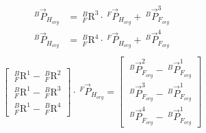 \documentclass[12pt]{article}
\begin{document}
\begin{CJK}{UTF8}{bsmi}
\begin{equation*}
\begin{split}
^{B}\vec{P}_{H_{org}} &=\  _{F}^{B}\textrm{R}^{3}\cdot\ ^{F}\vec{P}_{H_{org}} +\ ^{B}\vec{P}_{F_{org}}^{3}\\
^{B}\vec{P}_{H_{org}} &=\  _{F}^{B}\textrm{R}^{4}\cdot\ ^{F}\vec{P}_{H_{org}} +\ ^{B}\vec{P}_{F_{org}}^{4}\\
\end{split}
\end{equation*}		
\begin{equation*}
\begin{split}	
\begin{bmatrix}
\  _{F}^{B}\textrm{R}^{1} - \  _{F}^{B}\textrm{R}^{2}\\ 
\  _{F}^{B}\textrm{R}^{1} - \  _{F}^{B}\textrm{R}^{3}\\ 
\  _{F}^{B}\textrm{R}^{1} - \  _{F}^{B}\textrm{R}^{4}
\end{bmatrix}
\cdot\ ^{F}\vec{P}_{H_{org}} 
=
\begin{bmatrix}
\ ^{B}\vec{P}_{F_{org}}^{2} -\ ^{B}\vec{P}_{F_{org}}^{1} \\ 
\ ^{B}\vec{P}_{F_{org}}^{3} -\ ^{B}\vec{P}_{F_{org}}^{1} \\ 
\ ^{B}\vec{P}_{F_{org}}^{4} -\ ^{B}\vec{P}_{F_{org}}^{1} 
\end{bmatrix}
\end{split}
\end{equation*}


\end{CJK}
\end{document}

